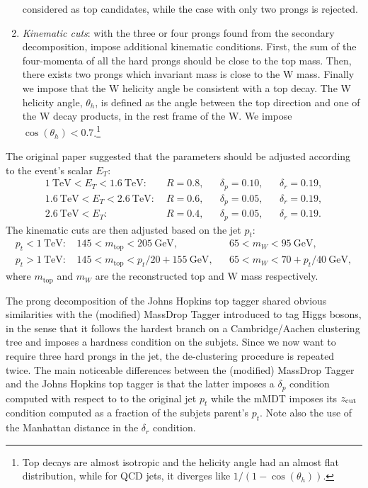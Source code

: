 \begin{enumerate}
  considered as top candidates, while the case with only two prongs is
  rejected.
\item {\em Kinematic cuts}: with the three or four prongs found from
  the secondary decomposition, impose additional kinematic
  conditions. First, the sum of the four-momenta of all the hard
  prongs should be close to the top mass. Then, there exists two
  prongs which invariant mass is close to the W mass. Finally we
  impose that the W helicity angle be consistent with a top
  decay.
  The W helicity angle, $\theta_h$, is defined as the angle between
  the top direction and one of the W decay products, in the rest
  frame of the W. We impose $\cos(\theta_h)<0.7$.\footnote{Top decays are almost isotropic and the helicity angle had
    an almost flat distribution, while for QCD jets, it diverges like
    $1/(1-\cos(\theta_h))$.}
\end{enumerate}
%
The original paper suggested that the parameters should be adjusted according to the
event's scalar $E_T$:
\begin{align}
  1~\text{TeV}<E_T<1.6~\text{TeV}:\;   & R=0.8, && \delta_p=0.10, && \delta_r=0.19, \\ 
  1.6~\text{TeV}<E_T<2.6~\text{TeV}:\; & R=0.6, && \delta_p=0.05, && \delta_r=0.19, \\
  2.6~\text{TeV}<E_T:\;                & R=0.4, && \delta_p=0.05, && \delta_r=0.19. 
\end{align}
The kinematic cuts are then adjusted based on the jet $p_t$:
\begin{align}
  p_t<1~\text{TeV: } & 145<m_\text{top}<205~\text{GeV}, && 65<m_{W}<95~\text{GeV}, \\ 
  p_t>1~\text{TeV: } & 145<m_\text{top}<p_t/20+155~\text{GeV}, && 65<m_{W}<70+p_t/40~\text{GeV},
\end{align}
where $m_\text{top}$ and $m_W$ are the reconstructed top and W mass respectively.

The prong decomposition of the Johns Hopkins top tagger shared
obvious similarities with the (modified) MassDrop Tagger introduced to
tag Higgs bosons, in the sense that it follows the hardest branch on a
Cambridge/Aachen clustering tree and imposes a hardness condition on
the subjets. Since we now want to require three hard prongs in the
jet, the de-clustering procedure is repeated twice. The main
noticeable differences between the (modified) MassDrop Tagger and the
Johns Hopkins top tagger is that the latter imposes a $\delta_p$
condition computed with respect to to the original jet $p_t$ while the mMDT
imposes its $z_{\text{cut}}$ condition computed as a fraction of the subjets
parent's $p_t$.
%
Note also the use of the Manhattan distance in the $\delta_r$
condition.

